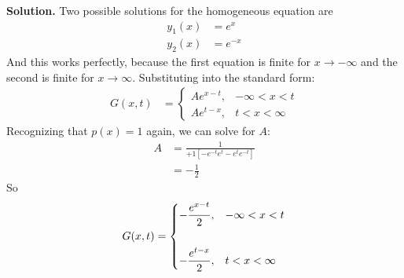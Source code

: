 \documentclass{article}
\begin{document}
\textbf{Solution.} Two possible solutions for the homogeneous equation are
\begin{equation*}
\begin{aligned}
	y_1(x) &= e^x \\
	y_2(x) &= e^{-x}
\end{aligned}
\end{equation*}
And this works perfectly, because the first equation is finite for $x \to -\infty$ and the second is finite for $x \to\infty$. Substituting into the standard form:
\begin{equation*}
\begin{aligned}
	G(x,t) &=
	\begin{cases}
		Ae^{x-t}, & -\infty < x < t \\
		Ae^{t-x}, & t < x < \infty
	\end{cases}
\end{aligned}
\end{equation*}
Recognizing that $p(x) = 1$ again, we can solve for $A$:
\begin{equation*}
\begin{aligned}
	A &= \frac{1}{+1\left[-e^{-t}e^t - e^t e^{-t}\right]} \\
		&= -\frac{1}{2}
\end{aligned}
\end{equation*}
So
\begin{equation*}
\begin{aligned}
	G(x,t) =
	\begin{dcases}
		-\frac{e^{x-t}}{2}, & -\infty < x < t  \\
		\phantom{.}\\
		-\frac{e^{t-x}}{2}, & t < x < \infty
	\end{dcases}
\end{aligned}
\end{equation*}
\end{document}
